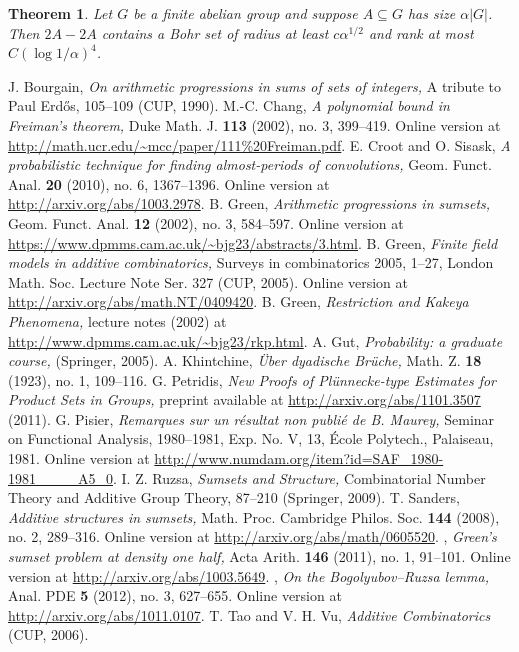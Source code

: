 \documentclass[12pt,a4paper,reqno]{amsart}
\numberwithin{equation}{section}
\theoremstyle{plain}
\newtheorem{theorem}[subsection]{Theorem}
\theoremstyle{definition}
\renewcommand{\subset}{\subseteq}
\providecommand{\abs}[1]{\lvert#1\rvert}
\theoremstyle{plain}
\begin{document}
\begin{theorem}\label{thm:tom_bogolyubov}
Let $G$ be a finite abelian group and suppose $A \subset G$ has size $\alpha \abs{G}$. Then $2A-2A$ contains a Bohr set of radius at least $c \alpha^{1/2}$ and rank at most $C(\log 1/\alpha)^4$.
\end{theorem}




\begin{thebibliography}{99}
 J. Bourgain, \emph{On arithmetic progressions in sums of sets of integers,} A tribute to Paul Erd\H{o}s, 105--109 (CUP, 1990).
 M.-C. Chang, \emph{A polynomial bound in Freiman's theorem,} Duke Math. J. \textbf{113} (2002), no. 3, 399--419. Online version at \url{http://math.ucr.edu/~mcc/paper/111\%20Freiman.pdf}.
 E. Croot and O. Sisask, \emph{A probabilistic technique for finding almost-periods of convolutions,} Geom. Funct. Anal. \textbf{20} (2010), no. 6, 1367--1396. Online version at \url{http://arxiv.org/abs/1003.2978}.
 B. Green, \emph{Arithmetic progressions in sumsets,} Geom. Funct. Anal. \textbf{12} (2002), no. 3, 584--597. Online version at \url{https://www.dpmms.cam.ac.uk/~bjg23/abstracts/3.html}.
 B. Green, \emph{Finite field models in additive combinatorics,} Surveys in combinatorics 2005, 1--27, London Math. Soc. Lecture Note Ser. 327 (CUP, 2005). Online version at \url{http://arxiv.org/abs/math.NT/0409420}.
 B. Green, \emph{Restriction and Kakeya Phenomena,} lecture notes (2002) at \url{http://www.dpmms.cam.ac.uk/~bjg23/rkp.html}.
 A. Gut, \emph{Probability: a graduate course,} (Springer, 2005).
 A. Khintchine, \emph{\"Uber dyadische Br\"uche,} Math. Z. \textbf{18} (1923), no. 1, 109--116.
 G. Petridis, \emph{New Proofs of Pl\"unnecke-type Estimates for Product Sets in Groups,} preprint available at \url{http://arxiv.org/abs/1101.3507} (2011).
 G. Pisier, \emph{Remarques sur un r\'esultat non publi\'e de {B}. {M}aurey,} {Seminar on {F}unctional {A}nalysis, 1980--1981}, {Exp. No. V, 13}, {\'Ecole Polytech.}, {Palaiseau}, {1981}. Online version at \url{http://www.numdam.org/item?id=SAF_1980-1981____A5_0}.
 I. Z. Ruzsa, \emph{Sumsets and Structure,} Combinatorial Number Theory and Additive Group Theory, 87--210 (Springer, 2009).
 T. Sanders, \emph{Additive structures in sumsets,} Math. Proc. Cambridge Philos. Soc. \textbf{144} (2008), no. 2, 289--316. Online version at \url{http://arxiv.org/abs/math/0605520}.
 \bysame, \emph{Green's sumset problem at density one half,} Acta Arith. \textbf{146} (2011), no. 1, 91--101. Online version at \url{http://arxiv.org/abs/1003.5649}.
 \bysame, \emph{On the Bogolyubov--Ruzsa lemma,} Anal. PDE \textbf{5} (2012), no. 3, 627--655. Online version at \url{http://arxiv.org/abs/1011.0107}.
 T. Tao and V. H. Vu, \emph{Additive Combinatorics} (CUP, 2006).
\end{thebibliography}
\end{document}
